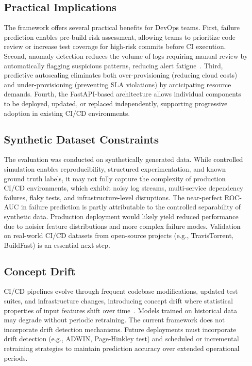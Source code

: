 \documentclass[sn-nature]{sn-jnl}
\theoremstyle{thmstyleone}
\theoremstyle{thmstyletwo}
\theoremstyle{thmstylethree}
\begin{document}
\subsection{Practical Implications}\label{subsec:practical}

The framework offers several practical benefits for DevOps teams.
First, failure prediction enables pre-build risk assessment, allowing teams to prioritize code review or increase test coverage for high-risk commits before CI execution.
Second, anomaly detection reduces the volume of logs requiring manual review by automatically flagging suspicious patterns, reducing alert fatigue~\cite{dang2019aiops}.
Third, predictive autoscaling eliminates both over-provisioning (reducing cloud costs) and under-provisioning (preventing SLA violations) by anticipating resource demands.
Fourth, the FastAPI-based architecture allows individual components to be deployed, updated, or replaced independently, supporting progressive adoption in existing CI/CD environments.

\subsection{Synthetic Dataset Constraints}\label{subsec:synthetic}

The evaluation was conducted on synthetically generated data.
While controlled simulation enables reproducibility, structured experimentation, and known ground truth labels, it may not fully capture the complexity of production CI/CD environments, which exhibit noisy log streams, multi-service dependency failures, flaky tests, and infrastructure-level disruptions.
The near-perfect ROC-AUC in failure prediction is partly attributable to the controlled separability of synthetic data.
Production deployment would likely yield reduced performance due to noisier feature distributions and more complex failure modes.
Validation on real-world CI/CD datasets from open-source projects (e.g., TravisTorrent, BuildFast) is an essential next step.

\subsection{Concept Drift}\label{subsec:drift}

CI/CD pipelines evolve through frequent codebase modifications, updated test suites, and infrastructure changes, introducing concept drift where statistical properties of input features shift over time~\cite{bayram2025trustworthy, abdullahi2025conceptdrift}.
Models trained on historical data may degrade without periodic retraining. The current framework does not incorporate drift detection mechanisms.
Future deployments must incorporate drift detection (e.g., ADWIN, Page-Hinkley test) and scheduled or incremental retraining strategies to maintain prediction accuracy over extended operational periods.
\end{document}
